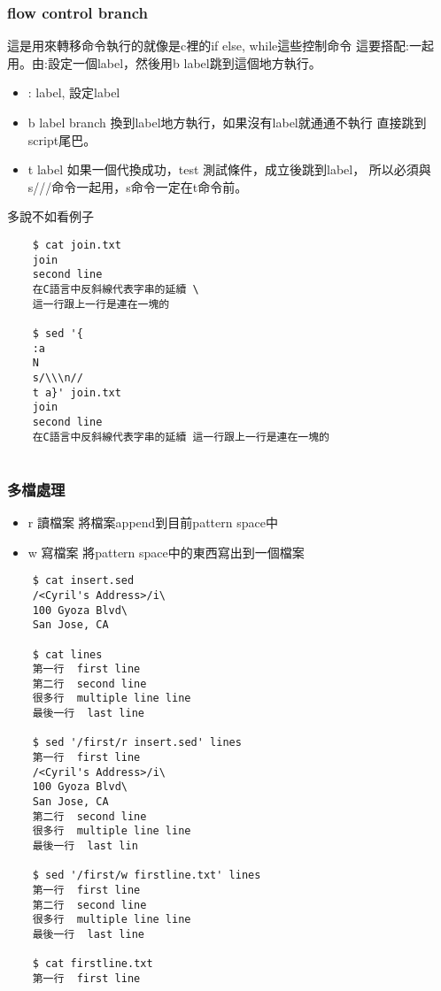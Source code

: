     \subsubsection{flow control branch}
    這是用來轉移命令執行的就像是c裡的if else, while這些控制命令
    這要搭配:一起用。由:設定一個label，然後用b label跳到這個地方執行。
    \begin{itemize}
    \item : label, 設定label
    \item b label  branch 換到label地方執行，如果沒有label就通通不執行
            直接跳到script尾巴。
    \item t label  如果一個代換成功，test 測試條件，成立後跳到label，
            所以必須與s///命令一起用，s命令一定在t命令前。
    \end{itemize}
    多說不如看例子
    \begin{verbatim}
    $ cat join.txt
    join
    second line
    在C語言中反斜線代表字串的延續 \
    這一行跟上一行是連在一塊的

    $ sed '{
    :a 
    N
    s/\\\n//
    t a}' join.txt
    join
    second line
    在C語言中反斜線代表字串的延續 這一行跟上一行是連在一塊的
    
    \end{verbatim}

    \subsubsection{多檔處理}
    \begin{itemize}
    \item r 讀檔案 將檔案append到目前pattern space中
    \item w 寫檔案 將pattern space中的東西寫出到一個檔案
    \end{itemize}
    \begin{verbatim}
    $ cat insert.sed
    /<Cyril's Address>/i\
    100 Gyoza Blvd\
    San Jose, CA

    $ cat lines
    第一行  first line
    第二行  second line
    很多行  multiple line line
    最後一行  last line

    $ sed '/first/r insert.sed' lines
    第一行  first line
    /<Cyril's Address>/i\
    100 Gyoza Blvd\
    San Jose, CA
    第二行  second line
    很多行  multiple line line
    最後一行  last lin

    $ sed '/first/w firstline.txt' lines
    第一行  first line
    第二行  second line
    很多行  multiple line line
    最後一行  last line

    $ cat firstline.txt
    第一行  first line

    \end{verbatim}
